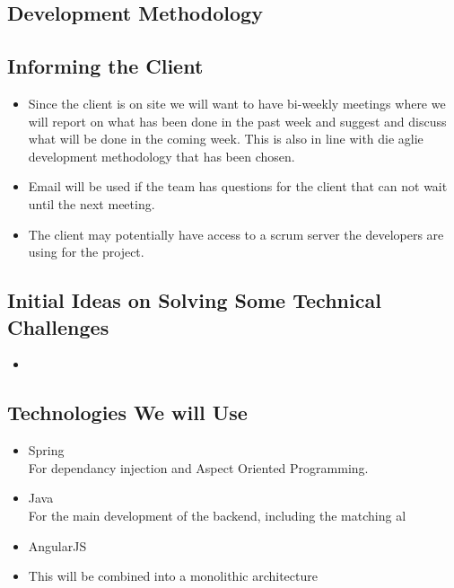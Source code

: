 \subsection{Development Methodology}


\subsection{Informing the Client}
\begin{itemize}
	\item Since the client is on site we will want to have bi-weekly meetings where we will report on what has been done in the past week and suggest and discuss what will be done in the coming week. This is also in line with die aglie development methodology that has been chosen.
	\item Email will be used if the team has questions for the client that can not wait until the next meeting.
	\item The client may potentially have access to a scrum server the developers are using for the project.
\end{itemize}

\subsection{Initial Ideas on Solving Some Technical Challenges}
\begin{itemize}
	\item 
\end{itemize}

\subsection{Technologies We will Use}
\begin{itemize}
	\item Spring\\
	For dependancy injection and Aspect Oriented Programming.
	\item Java\\
	For the main development of the backend, including the matching al
	\item AngularJS
	\item This will be combined into a monolithic architecture\\
\end{itemize}

